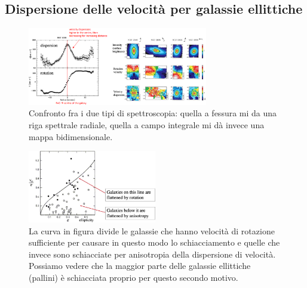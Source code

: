 \subsection{Dispersione delle velocità per galassie ellittiche}

\begin{figure}[htb]
    \centering
    \includegraphics[width =0.7\textwidth]{immagini/spettroscopia-fessura-campo-integrale.png}
    \caption{Confronto fra i due tipi di spettroscopia: quella a fessura mi da una riga spettrale radiale, quella a campo integrale mi dà invece una mappa bidimensionale.}
    \label{fig:spettroscopia-fessura-campo-integrale}
\end{figure}

\begin{figure}[htb]
    \centering
    \includegraphics[width = 0.5\textwidth]{immagini/schiacciamento-galassie.png}
    \caption{La curva in figura divide le galassie che hanno velocità di rotazione sufficiente per causare in questo modo lo schiacciamento e quelle che invece sono schiacciate per anisotropia della dispersione di velocità. Possiamo vedere che la maggior parte delle galassie ellittiche (pallini) è schiacciata proprio per questo secondo motivo.}
    \label{fig:schiacciamento-galassie}
\end{figure}

